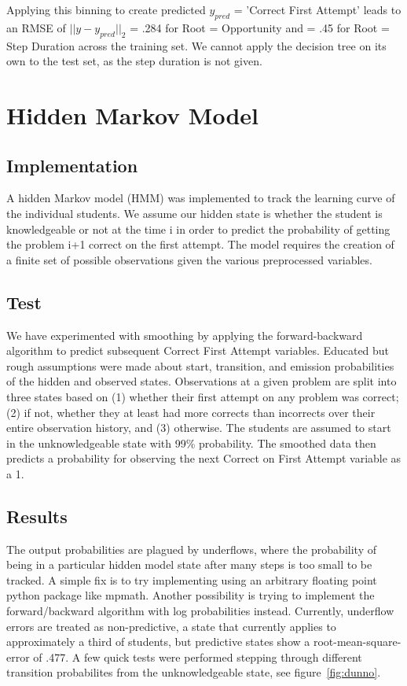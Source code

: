 \documentclass{article} %
\begin{document}
Applying this binning to create predicted $y_{pred}$ = 'Correct First Attempt' leads to an RMSE of $||y - y_{pred}||_2$ = .284 for Root = Opportunity and = .45 for Root = Step Duration across the training set. We cannot apply the decision tree on its own to the test set, as the step duration is not given.

\section{Hidden Markov Model}
\subsection{Implementation}
A hidden Markov model (HMM) was implemented to track the learning curve of the individual students. We assume our hidden state is whether the student is knowledgeable or not at the time i in order to predict the probability of getting the problem i+1 correct on the first attempt. The model requires the creation of a finite set of possible observations given the various preprocessed variables. 

\subsection{Test}
We have experimented with smoothing by applying the forward-backward algorithm to predict subsequent Correct First Attempt variables. Educated but rough assumptions were made about start, transition, and emission probabilities of the hidden and observed states. Observations at a given problem are split into three states based on (1) whether their first attempt on any problem was correct; (2) if not, whether they at least had more corrects than incorrects over their entire observation history, and (3) otherwise. The students are assumed to start in the unknowledgeable state with 99\% probability. The smoothed data then predicts a probability for observing the next Correct on First Attempt variable as a 1.

\subsection{Results}
The output probabilities are plagued by underflows, where the probability of being in a particular hidden model state after many steps is too small to be tracked. A simple fix is to try implementing using an arbitrary floating point python package like mpmath. Another possibility is trying to implement the forward/backward algorithm with log probabilities instead. Currently, underflow errors are treated as non-predictive, a state that currently applies to approximately a third of students, but predictive states show a root-mean-square-error of .477. A few quick tests were performed stepping through different transition probabilites from the unknowledgeable state, see figure~\ref{fig:dunno}.
\end{document}
